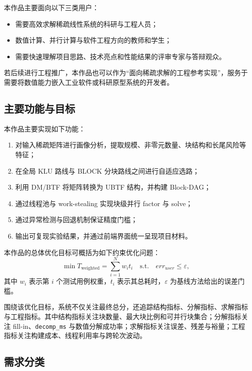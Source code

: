 \documentclass[12pt,a4paper,fontset=none]{ctexart}
\begin{document}
本作品主要面向以下三类用户：
\begin{itemize}
  \item 需要高效求解稀疏线性系统的科研与工程人员；
  \item 数值计算、并行计算与软件工程方向的教师和学生；
  \item 需要快速理解项目思路、技术亮点和性能结果的评审专家与答辩观众。
\end{itemize}

若后续进行工程推广，本作品也可以作为“面向稀疏求解的工程参考实现”，服务于需要将数值能力嵌入工业软件或科研原型系统的开发者。

\subsection{主要功能与目标}

本作品主要实现如下功能：
\begin{enumerate}
  \item 对输入稀疏矩阵进行画像分析，提取规模、非零元数量、块结构和长尾风险等特征；
  \item 在全局 KLU 路线与 BLOCK 分块路线之间进行自适应选路；
  \item 利用 DM/BTF 将矩阵转换为 UBTF 结构，并构建 Block-DAG；
  \item 通过线程池与 work-stealing 实现块级并行 factor 与 solve；
  \item 通过异常检测与回退机制保证精度门槛；
  \item 输出可复现实验结果，并通过前端界面统一呈现项目材料。
\end{enumerate}

本作品的总体优化目标可概括为如下约束优化问题：
\begin{equation}
\min T_{\mathrm{weighted}}=\sum_{i=1}^{N} w_i t_i
\quad\text{s.t.}\quad
err_{user}\le \varepsilon ,
\end{equation}
其中 $w_i$ 表示第 $i$ 个测试用例权重，$t_i$ 表示其总耗时，$\varepsilon$ 为基线方法给出的误差门槛。

围绕该优化目标，系统不仅关注最终总分，还追踪结构指标、分解指标、求解指标与工程指标。其中结构指标关注块数量、最大块比例和可并行块集合；分解指标关注 fill-in、\texttt{decomp\_ms} 与数值分解成功率；求解指标关注误差、残差与裕量；工程指标关注构建成本、线程利用率与跨轮次波动。

\subsection{需求分类}
\end{document}
